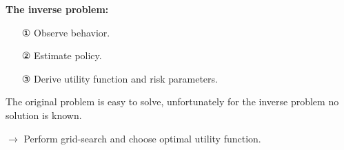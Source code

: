 \textbf{The inverse problem:}
\begin{itemize}
\item[①] Observe behavior.
\item[②] Estimate policy.
\item[③] Derive utility function and risk parameters.
\end{itemize}

The original problem is easy to solve, unfortunately for the inverse problem no solution is known. 

$\rightarrow$ Perform grid-search and choose optimal utility function.

